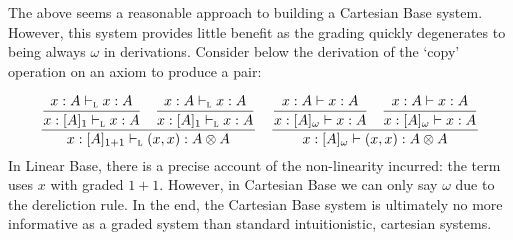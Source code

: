 \noindent
The above seems a reasonable approach to building a
Cartesian Base system. However, this system
provides little benefit as the grading quickly degenerates to
being always $\omega$ in derivations. Consider below the derivation of
the `copy' operation on an axiom to produce a pair:

\begin{align*}
\begin{array}{cc}
\dfrac{
\dfrac{x : A \vdash_{\textsc{l}} x : A}
      {x : [A]_1 \vdash_{\textsc{l}} x : A}
\quad
\dfrac{x : A \vdash_{\textsc{l}} x : A}
      {x : [A]_1 \vdash_{\textsc{l}} x : A}
}
{x : [A]_{1 + 1} \vdash_{\textsc{l}} (x, x) : A \otimes A}
&
\dfrac{
\dfrac{x : A \vdash x : A}
      {x : [A]_\omega \vdash x : A}
\quad
\dfrac{x : A \vdash x : A}
      {x : [A]_\omega \vdash x : A}
}
{x : [A]_\omega \vdash (x, x) : A \otimes A}
\end{array}
\end{align*}
%
In Linear Base, there is a precise account of the non-linearity
incurred: the term uses $x$ with graded $1+1$. However, in
Cartesian Base we can only say $\omega$ due to the dereliction rule.
In the end, the Cartesian Base system
is ultimately no more informative as a graded system than
standard intuitionistic, cartesian systems.

